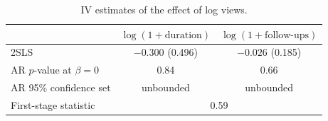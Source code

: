 \begin{table}[H]
\centering
\caption{IV estimates of the effect of log views.}
\label{tab:t3main}
\begin{tabular}{lcc}
\toprule
 & $\log(1+\text{duration})$ & $\log(1+\text{follow-ups})$ \\
\midrule
2SLS & $-0.300$ (0.496) & $-0.026$ (0.185) \\
AR $p$-value at $\beta=0$ & 0.84 & 0.66 \\
AR 95\% confidence set & unbounded & unbounded \\
First-stage statistic & \multicolumn{2}{c}{0.59} \\
\bottomrule
\end{tabular}
\end{table}
